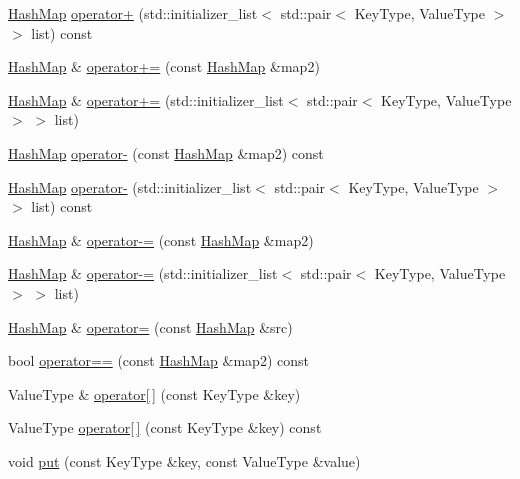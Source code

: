 \begin{DoxyCompactItemize}
\item 
\mbox{\hyperlink{classHashMap}{Hash\+Map}} \mbox{\hyperlink{classHashMap_a1df496930b881491ce05d421d6924b68}{operator+}} (std\+::initializer\+\_\+list$<$ std\+::pair$<$ Key\+Type, Value\+Type $>$ $>$ list) const
\item 
\mbox{\hyperlink{classHashMap}{Hash\+Map}} \& \mbox{\hyperlink{classHashMap_a24ad680f65038d2d6e9b406c8895ff29}{operator+=}} (const \mbox{\hyperlink{classHashMap}{Hash\+Map}} \&map2)
\item 
\mbox{\hyperlink{classHashMap}{Hash\+Map}} \& \mbox{\hyperlink{classHashMap_a600a652110f7aeece4551dfe39f91bae}{operator+=}} (std\+::initializer\+\_\+list$<$ std\+::pair$<$ Key\+Type, Value\+Type $>$ $>$ list)
\item 
\mbox{\hyperlink{classHashMap}{Hash\+Map}} \mbox{\hyperlink{classHashMap_a19a5b1e806f70ded0ad8c8405cb76827}{operator-\/}} (const \mbox{\hyperlink{classHashMap}{Hash\+Map}} \&map2) const
\item 
\mbox{\hyperlink{classHashMap}{Hash\+Map}} \mbox{\hyperlink{classHashMap_a2f7fc75dfe5f81887e45024b6b22b07a}{operator-\/}} (std\+::initializer\+\_\+list$<$ std\+::pair$<$ Key\+Type, Value\+Type $>$ $>$ list) const
\item 
\mbox{\hyperlink{classHashMap}{Hash\+Map}} \& \mbox{\hyperlink{classHashMap_aa83ed71e72154b05ef8383a1edf82a92}{operator-\/=}} (const \mbox{\hyperlink{classHashMap}{Hash\+Map}} \&map2)
\item 
\mbox{\hyperlink{classHashMap}{Hash\+Map}} \& \mbox{\hyperlink{classHashMap_ab0fc9969c9d5ebeada5561b18fa2b3eb}{operator-\/=}} (std\+::initializer\+\_\+list$<$ std\+::pair$<$ Key\+Type, Value\+Type $>$ $>$ list)
\item 
\mbox{\hyperlink{classHashMap}{Hash\+Map}} \& \mbox{\hyperlink{classHashMap_a5dc2970a57b73484140e087d338095ec}{operator=}} (const \mbox{\hyperlink{classHashMap}{Hash\+Map}} \&src)
\item 
bool \mbox{\hyperlink{classHashMap_a6d48826dae26d3467753daf4265ee951}{operator==}} (const \mbox{\hyperlink{classHashMap}{Hash\+Map}} \&map2) const
\item 
Value\+Type \& \mbox{\hyperlink{classHashMap_a5bd092d78b82b4818d17917816a59730}{operator\mbox{[}$\,$\mbox{]}}} (const Key\+Type \&key)
\item 
Value\+Type \mbox{\hyperlink{classHashMap_a9f52896b148cfbbc16e12ad1008971b1}{operator\mbox{[}$\,$\mbox{]}}} (const Key\+Type \&key) const
\item 
void \mbox{\hyperlink{classHashMap_af0d1d70a37332cb3054fe5b1b170927c}{put}} (const Key\+Type \&key, const Value\+Type \&value)

\end{DoxyCompactItemize}
